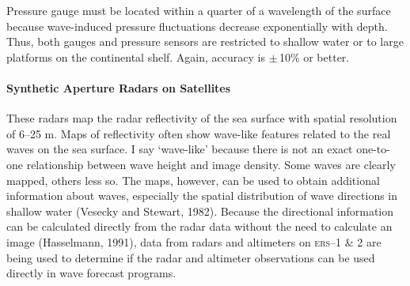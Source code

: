 Pressure gauge must be located within a quarter of a wavelength of the
surface because wave-induced pressure fluctuations decrease
exponentially with depth. Thus, both gauges and pressure sensors are
restricted to shallow water or to large platforms on the continental
shelf. Again, accuracy is $\pm \,$10\% or
better.


\paragraph{Synthetic Aperture Radars on Satellites}
These radars map the radar reflectivity of the sea surface with spatial resolution
of 6--25 m. Maps of reflectivity often show wave-like features related
to the real waves on the sea surface. I say `wave-like' because there
is not an exact one-to-one relationship between wave height and image
density. Some waves are clearly mapped, others less so. The maps,
however, can be used to obtain additional information about waves,
especially the spatial distribution of wave directions in shallow
water (Vesecky and Stewart, 1982). Because the directional information
can be calculated directly from the radar data without the need to
calculate an image (Hasselmann, 1991), data from radars and altimeters
on \textsc{ers}--1 \& 2 are being used to
determine if the radar and altimeter observations can be used directly
in wave forecast programs.

